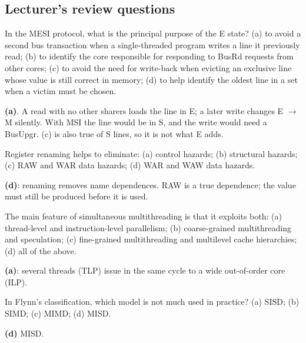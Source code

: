 \subsection{Lecturer's review questions}

\begin{exercise}[Lecturer 1]
In the MESI protocol, what is the principal purpose of the E state?
(a) to avoid a second bus transaction when a single-threaded program writes a line
it previously read; (b) to identify the core responsible for responding to BusRd
requests from other cores; (c) to avoid the need for write-back when evicting an
exclusive line whose value is still correct in memory; (d) to help identify the
oldest line in a set when a victim must be chosen.
\end{exercise}
\begin{solution}
\textbf{(a)}. A read with no other sharers loads the line in E; a later write changes
E $\to$ M silently. With MSI the line would be in S, and the write would need a
BusUpgr. (c) is also true of S lines, so it is not what E adds.
\end{solution}

\begin{exercise}[Lecturer 2]
Register renaming helps to eliminate: (a) control hazards; (b) structural hazards;
(c) RAW and WAR data hazards; (d) WAR and WAW data hazards.
\end{exercise}
\begin{solution}
\textbf{(d)}: renaming removes name dependences. RAW is a true dependence; the
value must still be produced before it is used.
\end{solution}

\begin{exercise}[Lecturer 4]
The main feature of simultaneous multithreading is that it exploits both:
(a) thread-level and instruction-level parallelism; (b) coarse-grained multithreading
and speculation; (c) fine-grained multithreading and multilevel cache hierarchies;
(d) all of the above.
\end{exercise}
\begin{solution}
\textbf{(a)}: several threads (TLP) issue in the same cycle to a wide out-of-order
core (ILP).
\end{solution}

\begin{exercise}[Lecturer 5]
In Flynn's classification, which model is not much used in practice?
(a) SISD; (b) SIMD; (c) MIMD; (d) MISD.
\end{exercise}
\begin{solution}
\textbf{(d)} MISD.
\end{solution}

